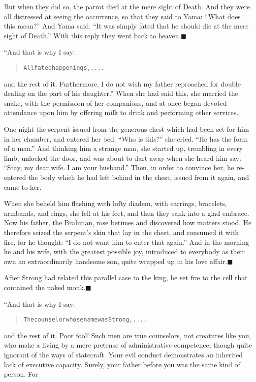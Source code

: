 \documentclass[article, twoside, 14pt]{memoir}
\newcommand{\qed}{\hfill \ensuremath{\blacksquare}}
\renewenvironment{verbatim}{%
\begin{quote}%
\vskip -10pt%
\begin{alltt}\normalfont\large}{\end{alltt}%
\end{quote}%
\vskip -10pt
} %
\begin{document}
But when they did so, the parrot died at the mere sight of Death.
And they were all distressed at seeing the occurrence, so that they
said to Yama: ``What does this mean?'' And Yama said:
``It was simply fated that he should die at the mere sight of Death.''
With this reply they went back to heaven.\hyperref[s27]{\qed}

“And that is why I say:

\begin{verbatim}
All fated happenings, ....
\end{verbatim}
and the rest of it. Furthermore, I do not wish my father reproached
for double dealing on the part of his daughter.” When she had said
this, she married the snake, with the permission of her companions,
and at once began devoted attendance upon him by offering milk to
drink and performing other services.

One night the serpent issued from the generous chest which had been
set for him in her chamber, and entered her bed. ``Who is this?''
she cried. ``He has the form of a man.'' And thinking him a strange
man, she started up, trembling in every limb, unlocked the door,
and was about to dart away when she heard him say:
``Stay, my dear wife. I am your husband.'' Then, in order to
convince her, he re-entered the body which he had left behind in
the chest, issued from it again, and came to her.

When she beheld him flashing with lofty diadem, with earrings,
bracelets, armbands, and rings, she fell at his feet, and then they
sank into a glad embrace. Now his father, the Brahman, rose betimes
and discovered how matters stood. He therefore seized the serpent's
skin that lay in the chest, and consumed it with fire, for he
thought: ``I do not want him to enter that again.'' And in the
morning he and his wife, with the greatest possible joy, introduced
to everybody as their own an extraordinarily handsome son, quite
wrapped up in his love affair.\hyperref[s26]{\qed}

After Strong had related this parallel case to the king, he set
fire to the cell that contained the naked
monk.\hyperref[s25]{\qed}

“And that is why I say:

\begin{verbatim}
The counselor whose name was Strong, ....
\end{verbatim}
and the rest of it. Poor fool! Such men are true counselors, not
creatures like you, who make a living by a mere pretense of
administrative competence, though quite ignorant of the ways of
statecraft. Your evil conduct demonstrates an inherited lack of
executive capacity. Surely, your father before you was the same
kind of person. For
\end{document}
